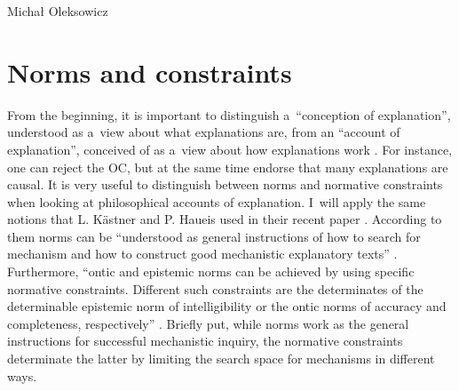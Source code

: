 \begin{artengenv}{Michał Oleksowicz}
\section{Norms and constraints}
From the beginning, it is important to distinguish a~``conception of explanation'', understood as a~view about what explanations are, from an ``account of explanation'', conceived of as a~view about how explanations work
\parencite[][p.263]{bokulich_fiction_2016}. %
 For instance, one can reject the OC, but at the same time endorse that many explanations are causal. It is very useful to distinguish between norms and normative constraints when looking at philosophical accounts of explanation. I~will apply the same notions that L. Kästner and P. Haueis used in their recent paper 
\parencite[][]{kastner_discovering_2021}. %
 According to them norms can be ``understood as general instructions of how to search for mechanism and how to construct good mechanistic explanatory texts'' 
\parencite[][p.1638]{kastner_discovering_2021}. %
 Furthermore, ``ontic and epistemic norms can be achieved by using specific normative constraints. Different such constraints are the determinates of the determinable epistemic norm of intelligibility or the ontic norms of accuracy and completeness, respectively'' 
\parencite[][p.1638]{kastner_discovering_2021}. %
 Briefly put, while norms work as the general instructions for successful mechanistic inquiry, the normative constraints determinate the latter by limiting the search space for mechanisms in different ways.


\end{artengenv}
